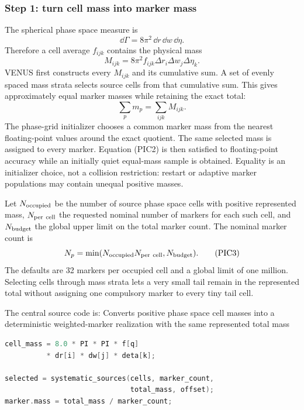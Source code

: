 \subsubsection{Step 1: turn cell mass into marker mass}

The spherical phase space measure is
\[
 \dd\Gamma=8\pi^2\,\dd r\,\dd w\,\dd\eta.
\]
Therefore a cell average \(f_{ijk}\) contains the physical mass
\[
 M_{ijk}=8\pi^2f_{ijk}\Delta r_i\Delta w_j\Delta\eta_k. \tag{PIC1}
\]
VENUS first constructs every \(M_{ijk}\) and its cumulative sum.  A set of
evenly spaced mass strata selects source cells from that cumulative sum.  This
gives approximately equal marker masses while retaining the exact total:
\[
 \sum_p m_p=\sum_{ijk}M_{ijk}.                            \tag{PIC2}
\]
The phase-grid initializer chooses a common marker mass from the nearest floating-point values
around the exact quotient.  The same selected mass is assigned to every
marker.  Equation (PIC2) is then satisfied to floating-point accuracy while
an initially quiet equal-mass sample is obtained.  Equality is an initializer
choice, not a collision restriction: restart or adaptive marker populations
may contain unequal positive masses.

Let \(N_{\rm occupied}\) be the number of source phase space cells with
positive represented mass, \(N_{\rm per\ cell}\) the requested nominal number
of markers for each such cell, and \(N_{\rm budget}\) the global upper limit on
the total marker count.  The nominal marker count is
\[
 N_p=\min(N_{\rm occupied}N_{\rm per\ cell},N_{\rm budget}). \tag{PIC3}
\]
The defaults are 32 markers per occupied cell and a global limit of one
million.  Selecting cells through mass strata lets a very small tail remain in
the represented total without assigning one compulsory marker to every tiny
tail cell.

The central source code is:
{}
{Converts positive phase space cell masses into a deterministic weighted-marker
 realization with the same represented total mass}
\begin{lstlisting}[language=C++]
cell_mass = 8.0 * PI * PI * f[q]
          * dr[i] * dw[j] * deta[k];

selected = systematic_sources(cells, marker_count,
                              total_mass, offset);
marker.mass = total_mass / marker_count;
\end{lstlisting}


